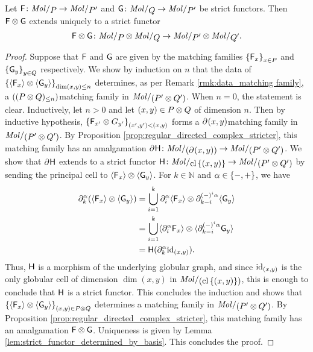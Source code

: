 \begin{lem} \label{lem:gray_of_strict_functors}
    Let \( \F \colon \molecin{P} \to \molecin{P'} \) and \( \G \colon \molecin{Q} \to \molecin{P'} \) be strict functors. 
    Then \( \F \gray \G \) extends uniquely to a strict functor 
    \begin{equation*}
        \F \gray \G \colon \molecin{P} \gray \molecin{Q} \to \molecin{P'} \gray \molecin{Q'}.
    \end{equation*}
\end{lem}
\begin{proof}
    Suppose that \( \F \) and \( \G \) are given by the matching families \( \set{\F_x}_{x \in P} \) and \( \set{\G_y}_{y \in Q} \) respectively.
    We show by induction on \( n \) that the data of \( \set{\pcell{\F_x} \gray \pcell{\G_y}}_{\dim (x, y) \le n} \) determines, as per Remark \ref{rmk:data_matching family}, a \( (\gr{\le n}{(P \gray Q)}) \)\nbd matching family in \( \molecin{(P' \gray Q')} \).
    When \( n = 0 \), the statement is clear. 
    Inductively, let \( n > 0 \) and let \( (x, y) \in P \gray Q \) of dimension \( n \). 
    Then by inductive hypothesis, \( \set{\F_{x'} \gray G_{y'}}_{(x', y') < (x, y)} \) forms a \( \bd{}{} (x, y) \)\nbd matching family in \( \molecin{(P' \gray Q')} \).
    By Proposition \ref{prop:regular_directed_complex_stricter}, this matching family has an amalgamation \( \bd{}{}\fun{H} \colon \molecin{(\bd{}{} (x, y))} \to \molecin{(P' \gray Q')} \).
    We show that \( \bd{}{} \fun{H} \) extends to a strict functor \( \fun{H} \colon \molecin{\clset{(x, y)}} \to \molecin{(P' \gray Q')} \) by sending the principal cell to \( \pcell{\F_x} \gray \pcell{\G_y} \).
    For \( k \in \mathbb{N} \) and \( \a \in \set{-, +} \), we have
    \begin{align*}
        \bd{k}{\a} (\pcell{\F_x} \gray \pcell{\G_y}) &= \bigcup_{i = 1}^k \bd{i}{\a} \pcell{\F_x} \gray \bd{k - i}{(-)^i\a} \pcell{\G_y} \\
                                       &= \bigcup_{i = 1}^k \pcell{\bd{i}{\a} \F_x} \gray \pcell{\bd{k - i}{(-)^i\a} \G_y} \\
                                       &= \fun{H}(\bd{k}{\a} \idd{(x, y)}).
    \end{align*}
    Thus, \( \fun{H} \) is a morphism of the underlying globular graph, and since \( \idd{(x, y)} \) is the only globular cell of dimension \( \dim (x, y) \) in \( \molecin{(\clset{(x, y)})} \), this is enough to conclude that \( \fun{H} \) is a strict functor.
    This concludes the induction and shows that \( \set{\pcell{\F_x} \gray \pcell{\G_y}}_{(x, y) \in P \gray Q} \) determines a matching family in \( \molecin{(P' \gray Q')} \).
    By Proposition \ref{prop:regular_directed_complex_stricter}, this matching family has an amalgamation \( \F \gray \G \).
    Uniqueness is given by Lemma \ref{lem:strict_functor_determined_by_basis}.
    This concludes the proof.
\end{proof}

